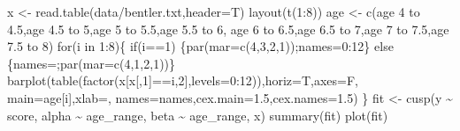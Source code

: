 \documentclass[
  a4paper,
  DIV=11,
  numbers=noendperiod,
  oneside]{scrreprt}
\newenvironment{Shaded}{}{}
\newcommand{\AttributeTok}[1]{\textcolor[rgb]{0.84,0.23,0.29}{#1}}
\newcommand{\ControlFlowTok}[1]{\textcolor[rgb]{0.84,0.23,0.29}{#1}}
\newcommand{\DecValTok}[1]{\textcolor[rgb]{0.00,0.36,0.77}{#1}}
\newcommand{\FloatTok}[1]{\textcolor[rgb]{0.00,0.36,0.77}{#1}}
\newcommand{\FunctionTok}[1]{\textcolor[rgb]{0.44,0.26,0.76}{#1}}
\newcommand{\NormalTok}[1]{\textcolor[rgb]{0.14,0.16,0.18}{#1}}
\newcommand{\OtherTok}[1]{\textcolor[rgb]{0.44,0.26,0.76}{#1}}
\newcommand{\SpecialCharTok}[1]{\textcolor[rgb]{0.00,0.36,0.77}{#1}}
\newcommand{\StringTok}[1]{\textcolor[rgb]{0.01,0.18,0.38}{#1}}
\begin{document}
\begin{Shaded}
\begin{Highlighting}[]
\NormalTok{x }\OtherTok{\textless{}{-}} \FunctionTok{read.table}\NormalTok{(}\StringTok{\textquotesingle{}data/bentler.txt\textquotesingle{}}\NormalTok{,}\AttributeTok{header=}\NormalTok{T)}
\FunctionTok{layout}\NormalTok{(}\FunctionTok{t}\NormalTok{(}\DecValTok{1}\SpecialCharTok{:}\DecValTok{8}\NormalTok{))}
\NormalTok{age }\OtherTok{\textless{}{-}} \FunctionTok{c}\NormalTok{(}\StringTok{\textquotesingle{}age 4 to 4.5\textquotesingle{}}\NormalTok{,}\StringTok{\textquotesingle{}age 4.5 to 5\textquotesingle{}}\NormalTok{,}\StringTok{\textquotesingle{}age 5 to 5.5\textquotesingle{}}\NormalTok{,}\StringTok{\textquotesingle{}age 5.5 to 6\textquotesingle{}}\NormalTok{,}
         \StringTok{\textquotesingle{}age 6 to 6.5\textquotesingle{}}\NormalTok{,}\StringTok{\textquotesingle{}age 6.5 to 7\textquotesingle{}}\NormalTok{,}\StringTok{\textquotesingle{}age 7 to 7.5\textquotesingle{}}\NormalTok{,}\StringTok{\textquotesingle{}age 7.5 to 8\textquotesingle{}}\NormalTok{)}
\ControlFlowTok{for}\NormalTok{(i }\ControlFlowTok{in} \DecValTok{1}\SpecialCharTok{:}\DecValTok{8}\NormalTok{)\{}
  \ControlFlowTok{if}\NormalTok{(i}\SpecialCharTok{==}\DecValTok{1}\NormalTok{) \{}\FunctionTok{par}\NormalTok{(}\AttributeTok{mar=}\FunctionTok{c}\NormalTok{(}\DecValTok{4}\NormalTok{,}\DecValTok{3}\NormalTok{,}\DecValTok{2}\NormalTok{,}\DecValTok{1}\NormalTok{));names}\OtherTok{=}\DecValTok{0}\SpecialCharTok{:}\DecValTok{12}\NormalTok{\} }\ControlFlowTok{else} 
\NormalTok{    \{names}\OtherTok{=}\StringTok{\textquotesingle{}\textquotesingle{}}\NormalTok{;}\FunctionTok{par}\NormalTok{(}\AttributeTok{mar=}\FunctionTok{c}\NormalTok{(}\DecValTok{4}\NormalTok{,}\DecValTok{1}\NormalTok{,}\DecValTok{2}\NormalTok{,}\DecValTok{1}\NormalTok{))\}}
  \FunctionTok{barplot}\NormalTok{(}\FunctionTok{table}\NormalTok{(}\FunctionTok{factor}\NormalTok{(x[x[,}\DecValTok{1}\NormalTok{]}\SpecialCharTok{==}\NormalTok{i,}\DecValTok{2}\NormalTok{],}\AttributeTok{levels=}\DecValTok{0}\SpecialCharTok{:}\DecValTok{12}\NormalTok{)),}\AttributeTok{horiz=}\NormalTok{T,}\AttributeTok{axes=}\NormalTok{F,}
          \AttributeTok{main=}\NormalTok{age[i],}\AttributeTok{xlab=}\StringTok{\textquotesingle{}\textquotesingle{}}\NormalTok{,}
          \AttributeTok{names=}\NormalTok{names,}\AttributeTok{cex.main=}\FloatTok{1.5}\NormalTok{,}\AttributeTok{cex.names=}\FloatTok{1.5}\NormalTok{)}
\NormalTok{\}}
\NormalTok{fit }\OtherTok{\textless{}{-}} \FunctionTok{cusp}\NormalTok{(y }\SpecialCharTok{\textasciitilde{}}\NormalTok{ score, alpha }\SpecialCharTok{\textasciitilde{}}\NormalTok{ age\_range, beta }\SpecialCharTok{\textasciitilde{}}\NormalTok{ age\_range, x)}
\FunctionTok{summary}\NormalTok{(fit)}
\FunctionTok{plot}\NormalTok{(fit)}
\end{Highlighting}
\end{Shaded}
\end{document}
